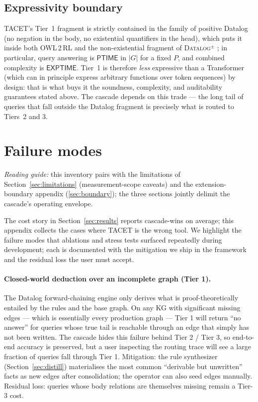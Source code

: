 \documentclass[11pt]{article}
\theoremstyle{plain}
\begin{document}
\subsection{Expressivity boundary}
\label{sec:expressivity}

TACET's Tier~1 fragment is strictly contained in the family of
positive Datalog (no negation in the body, no existential
quantifiers in the head), which puts it inside both
\textsc{OWL\,2\,RL} \cite{w3c2012owl2rl} and the
non-existential fragment of \textsc{Datalog}$^\pm$
\cite{cali2012datalogpm}; in particular, query answering is
$\mathsf{PTIME}$ in $|G|$ for a fixed $P$, and combined complexity
is $\mathsf{EXPTIME}$.  Tier~1 is therefore \emph{less} expressive
than a Transformer (which can in principle express arbitrary
functions over token sequences) by design: that is what buys it
the soundness, complexity, and auditability guarantees stated
above.  The cascade depends on this trade --- the long tail of
queries that fall outside the Datalog fragment is precisely what is
routed to Tiers~2 and 3.

\section{Failure modes}
\label{sec:failure_modes}
\noindent\emph{Reading guide:} this inventory pairs with the limitations of
Section~\ref{sec:limitations} (measurement-scope caveats) and the
extension-boundary appendix (\ref{sec:boundary}); the three sections jointly
delimit the cascade's operating envelope.

The cost story in Section~\ref{sec:results} reports cascade-wins on
average; this appendix collects the cases where TACET is the wrong
tool.  We highlight the failure modes that ablations and stress tests
surfaced repeatedly during development; each is documented with the
mitigation we ship in the framework and the residual loss the user
must accept.

\paragraph{Closed-world deduction over an incomplete graph (Tier 1).}
The Datalog forward-chaining engine only derives what is
proof-theoretically entailed by the rules and the base graph.
On any KG with significant missing edges --- which is essentially every
production graph --- Tier 1 will return ``no answer'' for queries
whose true tail is reachable through an edge that simply has not
been written.  The cascade hides this failure behind Tier 2 /
Tier 3, so end-to-end accuracy is preserved, but a user inspecting
the routing trace will see a large fraction of queries fall through
Tier 1.  Mitigation: the rule synthesizer (Section~\ref{sec:distill})
materialises the most common ``derivable but unwritten''
facts as new edges after consolidation; the operator can also seed
edges manually.  Residual loss: queries whose body relations are
themselves missing remain a Tier-3 cost.
\end{document}
